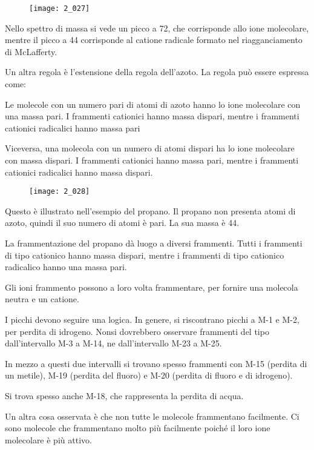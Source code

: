 \begin{figure}[H]
  \texttt{[image: 2\_027]}
\end{figure}

Nello spettro di massa si vede un picco a 72, che corrisponde allo ione
molecolare, mentre il picco a 44 corrisponde al catione radicale formato
nel riagganciamento di McLafferty.

Un altra regola è l'estensione della regola dell'azoto. La regola può
essere espressa come:

\begin{quoting}
Le molecole con un numero pari di atomi di azoto hanno lo ione
molecolare con una massa pari. I frammenti cationici hanno massa
dispari, mentre i frammenti cationici radicalici hanno massa pari

Viceversa, una molecola con un numero di atomi dispari ha lo ione
molecolare con massa dispari. I frammenti cationici hanno massa pari,
mentre i frammenti cationici radicalici hanno massa dispari.
\end{quoting}

\begin{figure}[H]
  \texttt{[image: 2\_028]}
\end{figure}

Questo è illustrato nell'esempio del propano. Il propano non presenta
atomi di azoto, quindi il suo numero di atomi è pari. La sua massa è 44.

La frammentazione del propano dà luogo a diversi frammenti. Tutti i
frammenti di tipo cationico hanno massa dispari, mentre i frammenti di
tipo cationico radicalico hanno una massa pari.

Gli ioni frammento possono a loro volta frammentare, per fornire una
molecola neutra e un catione.

I picchi devono seguire una logica. In genere, si riscontrano picchi a
M-1 e M-2, per perdita di idrogeno. Nonsi dovrebbero osservare frammenti
del tipo dall'intervallo M-3 a M-14, ne dall'intervallo M-23 a M-25.

In mezzo a questi due intervalli si trovano spesso frammenti con M-15
(perdita di un metile), M-19 (perdita del fluoro) e M-20 (perdita di
fluoro e di idrogeno).

Si trova spesso anche M-18, che rappresenta la perdita di acqua.

Un altra cosa osservata è che non tutte le molecole frammentano
facilmente. Ci sono molecole che frammentano molto più facilmente poiché
il loro ione molecolare è più attivo.

